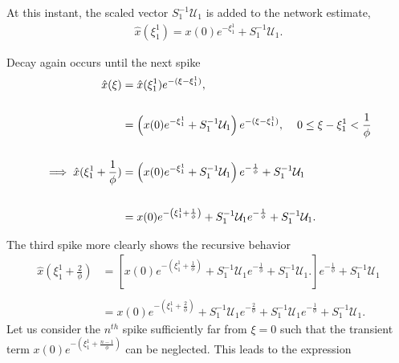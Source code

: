\begin{enumerate}
 At this instant, the scaled vector $ S_1^{-1} \mathcal{U}_1$ is added to the network estimate,
 \begin{align*}
 \hat{x}( \xi_1^1) =  x(0) e^{-\xi_1^1 } + S_1^{-1}\mathcal{U}_1.
 \end{align*}
 
Decay again occurs until the next spike
\begin{align*}
\hat{
	x
}
(
	\xi
)
&= \hat
{
	x
}
(
	\xi_{1}^1
)
e^
{
	-
	(
		\xi - \xi_{1}^1
	)
},
%
\\
\\
%
&=
\left(
	 x(0) e^
	 {
	 	-\xi_1^1
	 }
	 + S_1^
	 {
	 	-1
	 }
	 \mathcal{U}_1
\right)
e^
{
	-
	(
		\xi - 
		\xi_1^1
	)
} , \hspace{4mm} 
0 \leq \xi - \xi_1^1 <
\frac
{
	1
}
{
	\phi
}
%
\\
\\
%
\implies
\hat
{
	x
}
(
	\xi_1^1 + 
	\frac
	{
		1
	}
	{
		\phi
	}
)
&=
\left(
	x
	(
		0
	)
	e^
	{
		- \xi_1^1
	}
	 + S_1^
	 {
	 	-1
	 }
	 \mathcal{U}_1 
\right)
e^
{
	-
	\frac
	{
		1
	}
	{
		\phi
	}
}
+ S_1^
{
	-1
}
\mathcal{U}_1
\\
\\
&=
x
(
	0
)
e^
{	
	-\left(
		\xi_1^1 + 
		\frac
		{
			1
		}
		{
			\phi
		}
	\right)
}
+ S_1^
{
	-1
}
\mathcal{U}_1
e^
{
	-\frac
	{
		1
	}
	{
		\phi
	}
} 
+ S_1^
{
	-1
}
\mathcal{U}_1.
\end{align*}

The third spike more clearly shows the recursive behavior
\begin{align*}
\hat
{
	x
}
(
	\xi_1^1 + 
	\frac
	{
		2
	}
	{
		\phi
	}
)
&= 
\left[
	x
	(
		0
	)
	e^
	{	
		-\left(
			\xi_1^1 + 
			\frac
			{
				1
			}
			{
				\phi
			}
		\right)
	}
	+ S_1^
	{
		-1
	}
	\mathcal{U}_1
	e^
	{
		-\frac
		{
			1
		}
		{
			\phi
		}
	} 
	+ S_1^
	{
		-1
	}
	\mathcal{U}_1.
\right]
e^
{
	-\frac
	{
		1
	}
	{
			\phi
	}
}
+ S_1^
{
	-1
}
\mathcal{U}_1 
%
\\
\\
%
&= 
x
(
	0
)
e^
{	
	-\left(
		\xi_1^1 + 
		\frac
		{
			2
		}
		{
			\phi
		}
	\right)
}
+ S_1^
{
	-1
}
\mathcal{U}_1
e^
{
	-\frac
	{
		2
	}
	{
		\phi
	}
} 
+ S_1^
{
	-1
}
\mathcal{U}_1
e^
{
	-\frac
	{
		1
	}
	{
			\phi
	}
}
+ S_1^
{
	-1
}
\mathcal{U}_1.
\end{align*}
Let us consider the $n^{th}$ spike sufficiently far from $\xi=0$ such that the transient term $
x
(
	0
)
e^
{
	-\left(
		\xi_1^1	+ 
		\frac
		{
			n-1
		}
		{
			\phi
		}
	\right)
}
$ can be neglected. This leads to the expression


\end{enumerate}

